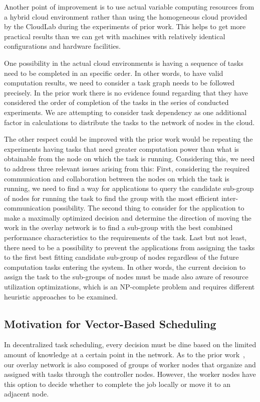 \documentclass{sig-alternate}
\begin{document}
Another point of improvement is to use actual variable computing resources from a hybrid cloud environment rather than using the homogeneous cloud provided by the CloudLab during the experiments of prior work\cite{peterson:decentralized}. This helps to get more practical results than we can get with machines with relatively identical configurations and hardware facilities.

One possibility in the actual cloud environments is having a sequence of tasks need to be completed in an specific order. In other words, to have valid computation results, we need to consider a task graph needs to be followed precisely. In the prior work\cite{peterson:decentralized} there is no evidence found regarding that they have considered the order of completion of the tasks in the series of conducted experiments. We are attempting to consider task dependency as one additional factor in calculations to distribute the tasks to the network of nodes in the cloud.

The other respect could be improved with the prior work\cite{peterson:decentralized} would be repeating the experiments having tasks that need greater computation power than what is obtainable from the node on which the task is running. Considering this, we need to address three relevant issues arising from this: First, considering the required communication and collaboration between the nodes on which the task is running, we need to find a way for applications to query the candidate sub-group of nodes for running the task to find the group with the most efficient inter-communication possibility. The second thing to consider for the application to make a maximally optimized decision and determine the direction of moving the work in the overlay network is to find a sub-group with the best combined performance characteristics to the requirements of the task. Last but not least, there need to be a possibility to prevent the applications from assigning the tasks to the first best fitting candidate sub-group of nodes regardless of the future computation tasks entering the system. In other words, the current decision to assign the task to the sub-groups of nodes must be made also aware of resource utilization optimizations, which is an NP-complete problem and requires different heuristic approaches to be examined\cite{sujan:efficient,mahendra:task-scheduling}.   



\subsection{Motivation for Vector-Based Scheduling}
In decentralized task scheduling, every decision must be dine based on the limited amount of knowledge at a certain point in the network. As to the prior work~\cite{peterson:decentralized}, our overlay network is also composed of groups of worker nodes that organize and assigned with tasks through the controller nodes. However, the worker nodes have this option to decide whether to complete the job locally or move it to an adjacent node.
\end{document}
